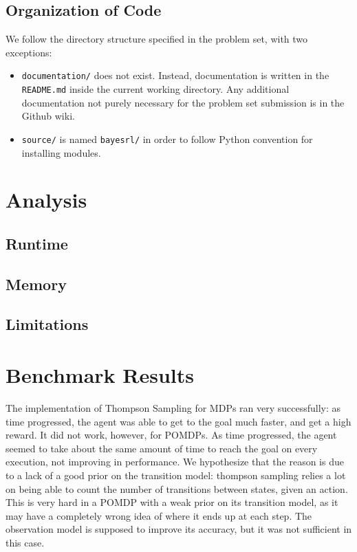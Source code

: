 \documentclass{pset}
\begin{document}
\subsection{Organization of Code}
We follow the directory structure specified in the problem set, with two
exceptions:
\begin{itemize}
\item \texttt{documentation/} does not exist. Instead, documentation is written
in the \texttt{README.md} inside the current working directory. Any additional
documentation not purely necessary for the problem set submission is in the
Github wiki.
\item \texttt{source/} is named \texttt{bayesrl/} in order to follow Python
convention for installing modules.
\end{itemize}

\section{Analysis}

\subsection{Runtime}

\subsection{Memory}

\subsection{Limitations}

\section{Benchmark Results}
The implementation of Thompson Sampling for MDPs ran very successfully: as time
progressed, the agent was able to get to the goal much faster, and get a high
reward. It did not work, however, for POMDPs. As time progressed, the agent seemed
to take about the same amount of time to reach the goal on every execution, not
improving in performance. We hypothesize that the reason is due to a lack of
a good prior on the transition model: thompson sampling relies a lot on being
able to count the number of transitions between states, given an action. This
is very hard in a POMDP with a weak prior on its transition model, as it may have
a completely wrong idea of where it ends up at each step. The observation model
is supposed to improve its accuracy, but it was not sufficient in this case.
\end{document}
